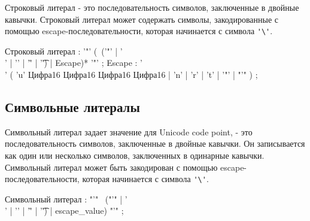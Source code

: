 Строковый литерал - это последовательность символов, заключенные в двойные кавычки. Строковый литерал может содержать символы, закодированные с помощью escape-последовательности, которая начинается с символа \verb+'\'+.

\begin{Grammar}
Строковый литерал
    : '"'
    (~('"' | '\\' | '\n' | '\r' | '\t') | Escape)* 
    '"' 
    ;
Escape
    : '\\'
    ( 'u' Цифра16 Цифра16 Цифра16 Цифра16
    | 'n' | 'r' | 't' 
    | '"'
    | "'"
    )
    ;    
\end{Grammar}  

\hypertarget{symlit}{%
\subsection{Символьные литералы}\label{lex:symlit}}

Символьный литерал задает значение для Unicode code point, - это последовательность символов, заключенные в двойные кавычки.
Он записывается как один или несколько символов, заключенных в одинарные кавычки. Символьный литерал может быть закодирован с помощью escape-последовательности, которая начинается с символа \verb+'\'+.

\begin{Grammar}
Символьный литерал
    : "'" 
    ~("'" | '\\' | '\n' | '\r' | '\t') | escape_value)
    "'"
    ;
\end{Grammar}  